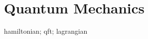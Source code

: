 \chapter{Quantum Mechanics}\label{chp:quantum_mechanics}

\gls{hamiltonian};
\gls{qft};
\gls{lagrangian}
